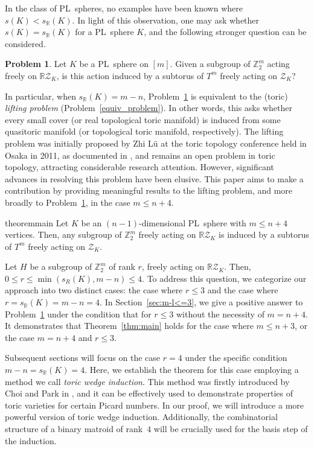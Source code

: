 \documentclass[11pt]{amsart}
\theoremstyle{plain}
\numberwithin{equation}{section}
\theoremstyle{definition}
\newtheorem{problem}[theorem]{Problem}
\newcommand{\R}{\mathbb{R}}
\newcommand{\Z}{\mathbb{Z}}
\newcommand{\cZ}{\mathcal{Z}}
\begin{document}
In the class of PL~spheres, no examples have been known where  $s(K) < s_\R(K)$.
In light of this observation, one may ask whether $s(K)=s_\R(K)$ for a PL~sphere $K$, and the following stronger question can be considered.

\begin{problem} \label{problem}
    Let $K$ be a PL~sphere on $[m]$.
    Given a subgroup of $\Z_2^m$ acting freely on $\R\cZ_K$, is this action induced by a subtorus of $T^m$ freely acting on $\cZ_K$?
\end{problem}



In particular, when $s_\R(K) = m-n$, Problem~\ref{problem} is equivalent to the (toric) \emph{lifting problem} (Problem~\ref{equiv_problem}).
In other words, this asks whether every small cover (or real topological toric manifold) is induced from some quasitoric manifold (or topological toric manifold, respectively).
The lifting problem was initially proposed by Zhi L\"{u} at the toric topology conference held in Osaka in 2011, as documented in \cite{Choi-Park2016}, and remains an open problem in toric topology, attracting considerable research attention.
However, significant advances in resolving this problem have been elusive.
This paper aims to make a contribution by providing meaningful results to the lifting problem, and more broadly to Problem~\ref{problem}, in the case $m \leq n+4$.

\begin{restatable}{theorem}{main} \label{thm:main}
     Let $K$ be an $(n-1)$-dimensional PL~sphere with $m \leq n+4$ vertices.
     Then, any subgroup of $\Z_2^m$ freely acting on $\R\cZ_K$ is induced by a subtorus of $T^m$ freely acting on $\cZ_K$.
\end{restatable}

Let $H$ be a subgroup of $\Z_2^m$  of rank $r$, freely acting on $\R\cZ_K$.
Then, $0 \leq r \leq \min(s_R(K),m-n) \leq 4$.
To address this question, we categorize our approach into two distinct cases: the case where $r \leq 3$ and the case where $r=s_\R(K)= m-n=4$.
In Section~\ref{sec:m-l<=3}, we give a positive answer to Problem~\ref{problem} under the condition that for $r \leq 3$ without the necessity of $m=n+4$.
It demonstrates that Theorem~\ref{thm:main} holds for the case where $m \leq n+3$, or the case  $m=n+4$ and $r \leq 3$.


Subsequent sections will focus on the case $r = 4$ under the specific condition $m-n=s_\R(K)=4$.
Here, we establish the theorem for this case employing a method we call \emph{toric wedge induction}.
This method was firstly introduced by Choi and Park in \cite{Choi-Park2016}, and it can be effectively used to demonstrate properties of toric varieties for certain Picard numbers. 
In our proof, we will introduce a more powerful version of toric wedge induction. 
Additionally, the combinatorial structure of a binary matroid of rank~$4$ will be crucially used for the basis step of the induction.
\end{document}
